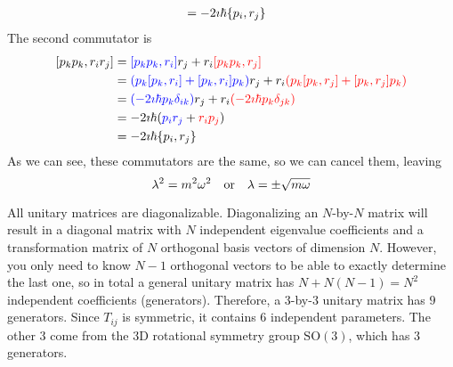 \documentclass[a4paper,twoside]{article}
\begin{document}
\begin{problem}
\begin{align}
        &= - 2 \imath \hbar \pb{p_i}{r_j}
    \end{align}
    The second commutator is
    \begin{align}
        \comm{p_k p_k}{r_i r_j} &= \color{blue}\comm{p_k p_k}{r_i}\color{black} r_j + r_i \color{red}\comm{p_k p_k}{r_j} \color{black} \\
        &= \color{blue} (p_k \comm{p_k}{r_i} + \comm{p_k}{r_i} p_k) \color{black} r_j + r_i \color{red} (p_k \comm{p_k}{r_j} + \comm{p_k}{r_j} p_k) \color{black} \\
        &= \color{blue} (- 2 \imath \hbar p_k \delta_{ik}) \color{black} r_j + r_i \color{red} (- 2 \imath \hbar p_k \delta_{jk}) \color{black} \\
        &= - 2 \imath \hbar (\color{blue} p_i r_j \color{black} + \color{red} r_i p_j \color{black}) \\
        &= - 2 \imath \hbar \pb{p_i}{r_j}
    \end{align}
    As we can see, these commutators are the same, so we can cancel them, leaving
    \begin{equation}
        \lambda^2 = m^2 \omega^2 \qor \lambda = \pm \sqrt{m \omega}
    \end{equation}

    

    All unitary matrices are diagonalizable. Diagonalizing an $ N $-by-$ N $ matrix will result in a diagonal matrix with $ N $ independent eigenvalue coefficients and a transformation matrix of $ N $ orthogonal basis vectors of dimension $ N $. However, you only need to know $ N - 1 $ orthogonal vectors to be able to exactly determine the last one, so in total a general unitary matrix has $ N + N(N - 1) = N^2 $ independent coefficients (generators). Therefore, a $ 3 $-by-$ 3 $ unitary matrix has $ 9 $ generators. Since $ T_{ij} $ is symmetric, it contains $ 6 $ independent parameters. The other $ 3 $ come from the 3D rotational symmetry group $\text{SO}(3)$, which has $ 3 $ generators.
\end{problem}
\end{document}
